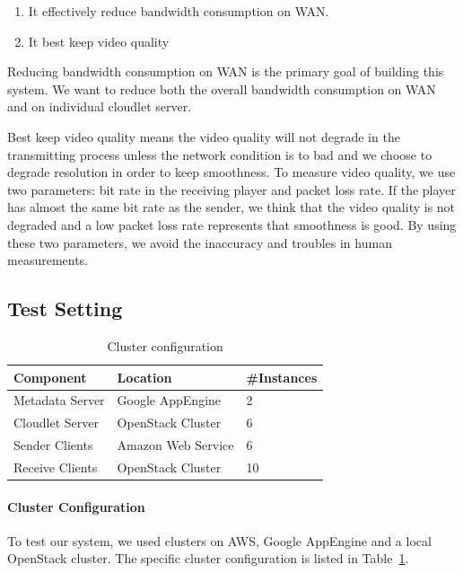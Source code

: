\documentclass[letterpaper,twocolumn,10pt]{article}
\begin{document}
\begin{enumerate}
  \item It effectively reduce bandwidth consumption on WAN.
  \item It best keep video quality
\end{enumerate}

Reducing bandwidth consumption on WAN is the primary goal of building this system. We want to reduce both the overall bandwidth consumption on WAN and on individual cloudlet server. 

Best keep video quality means the video quality will not degrade in the transmitting process unless the network condition is to bad and we choose to degrade resolution in order to keep smoothness. To measure video quality, we use two parameters: bit rate in the receiving player and packet loss rate. If the player has almost the same bit rate as the sender, we think that the video quality is not degraded and a low packet loss rate represents that smoothness is good. By using these two parameters, we avoid the inaccuracy and troubles in human measurements.

\subsection{Test Setting}
\begin{table}[t]
\begin{tabular}{|l|l|l|}
\hline
Component       & Location                & \#Instances\\ \hline
Metadata Server & Google AppEngine        & 2               \\ \hline
Cloudlet Server & OpenStack Cluster & 6               \\ \hline
Sender Clients  & Amazon Web Service      & 6               \\ \hline
Receive Clients & OpenStack Cluster & 10              \\ \hline
\end{tabular}
\caption{Cluster configuration}
\label{table:cluster}
\end{table}

\paragraph{Cluster Configuration}
To test our system, we used clusters on AWS, Google AppEngine and a local OpenStack cluster. The specific cluster configuration is listed in Table~\ref{table:cluster}.
\end{document}
